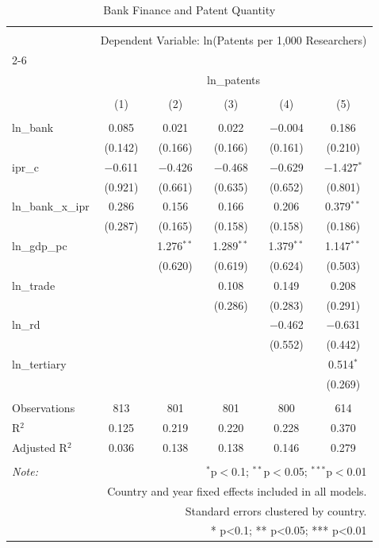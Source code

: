 
\begin{table}[!htbp] \centering 
  \caption{Bank Finance and Patent Quantity} 
  \label{} 
\begin{tabular}{@{\extracolsep{5pt}}lccccc} 
\\[-1.8ex]\hline 
\hline \\[-1.8ex] 
 & \multicolumn{5}{c}{Dependent Variable: ln(Patents per 1,000 Researchers)} \\ 
\cline{2-6} 
\\[-1.8ex] & \multicolumn{5}{c}{ln\_patents} \\ 
\\[-1.8ex] & (1) & (2) & (3) & (4) & (5)\\ 
\hline \\[-1.8ex] 
 ln\_bank & 0.085 & 0.021 & 0.022 & $-$0.004 & 0.186 \\ 
  & (0.142) & (0.166) & (0.166) & (0.161) & (0.210) \\ 
  ipr\_c & $-$0.611 & $-$0.426 & $-$0.468 & $-$0.629 & $-$1.427$^{*}$ \\ 
  & (0.921) & (0.661) & (0.635) & (0.652) & (0.801) \\ 
  ln\_bank\_x\_ipr & 0.286 & 0.156 & 0.166 & 0.206 & 0.379$^{**}$ \\ 
  & (0.287) & (0.165) & (0.158) & (0.158) & (0.186) \\ 
  ln\_gdp\_pc &  & 1.276$^{**}$ & 1.289$^{**}$ & 1.379$^{**}$ & 1.147$^{**}$ \\ 
  &  & (0.620) & (0.619) & (0.624) & (0.503) \\ 
  ln\_trade &  &  & 0.108 & 0.149 & 0.208 \\ 
  &  &  & (0.286) & (0.283) & (0.291) \\ 
  ln\_rd &  &  &  & $-$0.462 & $-$0.631 \\ 
  &  &  &  & (0.552) & (0.442) \\ 
  ln\_tertiary &  &  &  &  & 0.514$^{*}$ \\ 
  &  &  &  &  & (0.269) \\ 
 \hline \\[-1.8ex] 
Observations & 813 & 801 & 801 & 800 & 614 \\ 
R$^{2}$ & 0.125 & 0.219 & 0.220 & 0.228 & 0.370 \\ 
Adjusted R$^{2}$ & 0.036 & 0.138 & 0.138 & 0.146 & 0.279 \\ 
\hline 
\hline \\[-1.8ex] 
\textit{Note:}  & \multicolumn{5}{r}{$^{*}$p$<$0.1; $^{**}$p$<$0.05; $^{***}$p$<$0.01} \\ 
 & \multicolumn{5}{r}{Country and year fixed effects included in all models.} \\ 
 & \multicolumn{5}{r}{Standard errors clustered by country.} \\ 
 & \multicolumn{5}{r}{* p<0.1; ** p<0.05; *** p<0.01} \\ 
\end{tabular} 
\end{table} 
